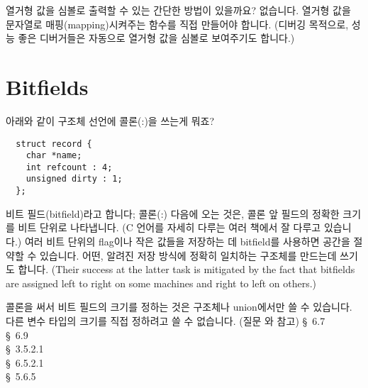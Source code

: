 \begin{faq}
	열거형 값을 심볼로 출력할 수 있는 간단한 방법이 있을까요?
\A
	없습니다.  열거형 값을 문자열로 매핑(mapping)시켜주는 
	함수를 직접 만들어야 합니다.  (디버깅 목적으로, 성능 좋은 디버거들은
	자동으로 열거형 값을 심볼로 보여주기도 합니다.)
\end{faq}

\section{Bitfields}

\begin{faq}
        아래와 같이 구조체 선언에 콜론(:)을 쓰는게 뭐죠?
\begin{verbatim}
  struct record {
    char *name;
    int refcount : 4;
    unsigned dirty : 1;
  };
\end{verbatim}
\A
        비트 필드(bitfield)라고 합니다; 콜론(:) 다음에 오는 것은, 콜론 앞 필드의
        정확한 크기를 비트 단위로 나타냅니다. (C 언어를 자세히 다루는 여러 책에서 잘 다루고
        있습니다.) 여러 비트 단위의 flag이나 작은 값들을 저장하는 데 bitfield를 사용하면
        공간을 절약할 수 있습니다. 어떤, 알려진 저장 방식에 정확히 일치하는 구조체를 만드는데
        쓰기도 합니다. (Their success at the latter task is mitigated by the
        fact that bitfields are assigned left to right on some machines
        and right to left on others.)

        콜론을 써서 비트 필드의 크기를 정하는 것은 구조체나 union에서만 쓸 수 있습니다.
        다른 변수 타입의 크기를 직접 정하려고 쓸 수 없습니다. (질문 와  참고)
\R
        \cite{kr1} \S\ 6.7  \\
        \cite{kr2} \S\ 6.9  \\
        \cite{ansi} \S\ 3.5.2.1 \\
        \cite{c89} \S\ 6.5.2.1 \\
        \cite{hs} \S\ 5.6.5 
\end{faq}

